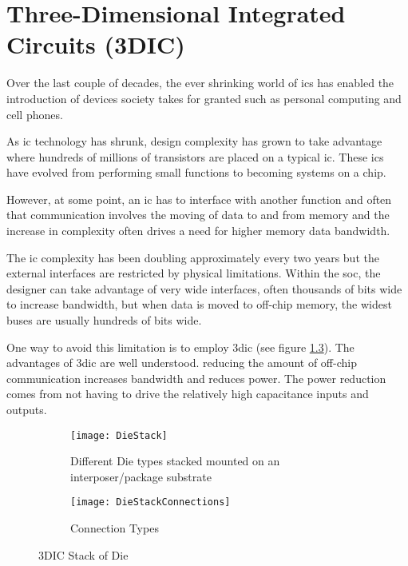 

\chapter{Three-Dimensional Integrated Circuits (3DIC)}
\label{sec:3dic}

Over the last couple of decades, the ever shrinking world of \acp{ic} has enabled the introduction of devices society takes for granted such as personal computing and cell phones.

As \ac{ic} technology has shrunk, design complexity has grown to take advantage where hundreds of millions of transistors are placed on a typical \ac{ic}.
These \acp{ic} have evolved from performing small functions to becoming systems on a chip.

However, at some point, an \ac{ic} has to interface with another function and often that communication involves the moving of data to and from memory and the increase in complexity often drives a need for higher memory data bandwidth. 

The \ac{ic} complexity has been doubling approximately every two years but the external interfaces are restricted by physical limitations.
Within the \ac{soc}, the designer can take advantage of very wide interfaces, often thousands of bits wide to increase bandwidth, but when data is moved to off-chip memory, the widest buses are usually hundreds of bits wide.

One way to avoid this limitation is to employ \ac{3dic} (see figure \ref{fig:3DIC Die}). The advantages of \ac{3dic} are well understood. reducing the amount of off-chip communication increases bandwidth and reduces power. The power reduction comes from not having to drive the relatively
high capacitance inputs and outputs.

\begin{figure}
\centering
\begin{subfigure}{.8\textwidth}
  \centering
  \texttt{[image: DieStack]}
  \captionsetup{justification=centering, skip=5pt}
  \caption{Different Die types stacked mounted on an interposer/package substrate}
  \label{fig:Die Stack}
\end{subfigure}%

\bigskip

\begin{subfigure}{.8\textwidth}
  \centering
  \texttt{[image: DieStackConnections]}
  \captionsetup{justification=centering, skip=5pt}
  \caption{Connection Types}
  \label{fig:Die Stack Connection Types}
\end{subfigure}
\captionsetup{justification=centering, skip=12pt}
\caption[3DIC Stack of Die]{3DIC Stack of Die}
\label{fig:3DIC Die}
\end{figure}

